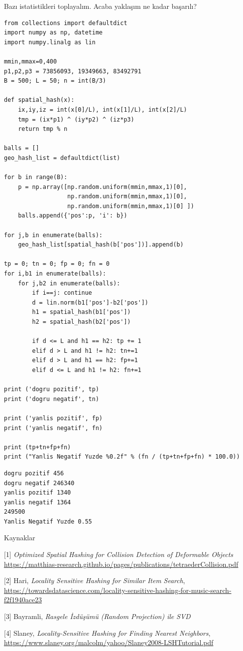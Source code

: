 \documentclass[12pt,fleqn]{article}\usepackage{../../common}
\begin{document}
Bazı istatistikleri toplayalım. Acaba yaklaşım ne kadar başarılı?

\begin{verbatim}
from collections import defaultdict 
import numpy as np, datetime
import numpy.linalg as lin

mmin,mmax=0,400
p1,p2,p3 = 73856093, 19349663, 83492791
B = 500; L = 50; n = int(B/3)

def spatial_hash(x):
    ix,iy,iz = int(x[0]/L), int(x[1]/L), int(x[2]/L)
    tmp = (ix*p1) ^ (iy*p2) ^ (iz*p3)
    return tmp % n
    
balls = []
geo_hash_list = defaultdict(list)

for b in range(B):
    p = np.array([np.random.uniform(mmin,mmax,1)[0],
                  np.random.uniform(mmin,mmax,1)[0],
                  np.random.uniform(mmin,mmax,1)[0] ])
    balls.append({'pos':p, 'i': b})

for j,b in enumerate(balls):
    geo_hash_list[spatial_hash(b['pos'])].append(b)

tp = 0; tn = 0; fp = 0; fn = 0
for i,b1 in enumerate(balls):
    for j,b2 in enumerate(balls):
        if i==j: continue
        d = lin.norm(b1['pos']-b2['pos'])
        h1 = spatial_hash(b1['pos'])
        h2 = spatial_hash(b2['pos'])
        
        if d <= L and h1 == h2: tp += 1        
        elif d > L and h1 != h2: tn+=1
        elif d > L and h1 == h2: fp+=1
        elif d <= L and h1 != h2: fn+=1

print ('dogru pozitif', tp)
print ('dogru negatif', tn)

print ('yanlis pozitif', fp)
print ('yanlis negatif', fn)

print (tp+tn+fp+fn)
print ("Yanlis Negatif Yuzde %0.2f" % (fn / (tp+tn+fp+fn) * 100.0))
\end{verbatim}

\begin{verbatim}
dogru pozitif 456
dogru negatif 246340
yanlis pozitif 1340
yanlis negatif 1364
249500
Yanlis Negatif Yuzde 0.55
\end{verbatim}






Kaynaklar

[1] {\em Optimized Spatial Hashing for Collision Detection of Deformable Objects}
    \url{https://matthias-research.github.io/pages/publications/tetraederCollision.pdf}

[2] Hari, {\em Locality Sensitive Hashing for Similar Item Search},
    \url{https://towardsdatascience.com/locality-sensitive-hashing-for-music-search-f2f1940ace23}

[3] Bayramli, {\em Rasgele İzdüşümü (Random Projection) ile SVD}

[4] Slaney, {\em Locality-Sensitive Hashing for Finding Nearest Neighbors},
    \url{https://www.slaney.org/malcolm/yahoo/Slaney2008-LSHTutorial.pdf}
    
\end{document}
